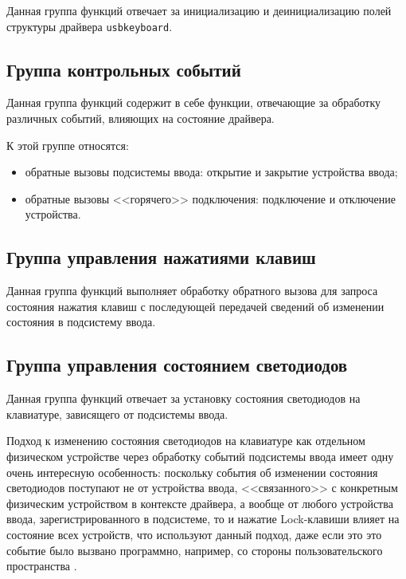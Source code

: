 Данная группа функций отвечает за инициализацию и деинициализацию
полей структуры драйвера \texttt{usbkeyboard}.

\subsection{Группа контрольных событий}

Данная группа функций содержит в себе функции, отвечающие
за обработку различных событий, влияющих на состояние драйвера.

К этой группе относятся:
\begin{itemize}
    \item обратные вызовы подсистемы ввода: открытие и закрытие устройства ввода;
    \item обратные вызовы <<горячего>> подключения: подключение и отключение устройства.
\end{itemize}

\subsection{Группа управления нажатиями клавиш}

Данная группа функций выполняет обработку обратного вызова для запроса
состояния нажатия клавиш с последующей передачей сведений об изменении состояния
в подсистему ввода.

\subsection{Группа управления состоянием светодиодов}

Данная группа функций отвечает за установку состояния светодиодов на клавиатуре,
зависящего от подсистемы ввода.

Подход к изменению состояния светодиодов на клавиатуре как отдельном
физическом устройстве через обработку событий подсистемы ввода имеет
одну очень интересную особенность: поскольку события об изменении состояния
светодиодов поступают не от устройства ввода, <<связанного>> с конкретным физическим
устройством в контексте драйвера, а вообще от любого устройства ввода,
зарегистрированного в подсистеме, то и нажатие Lock-клавиши
влияет на состояние всех устройств, что используют данный подход,
даже если это это событие было вызвано программно, 
например, со стороны пользовательского пространства \cite{rubini}.